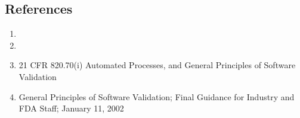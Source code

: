 \subsection{References}
\begin{enumerate}
  \item \sopSDLC
  \item \sopSCM
  \item 21 CFR 820.70(i) Automated Processes, and General Principles of Software
    Validation
  \item General Principles of Software Validation; Final Guidance for Industry
    and FDA Staff; January 11, 2002
\end{enumerate}
